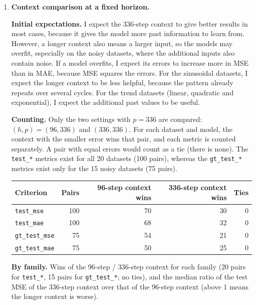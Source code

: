 \documentclass[12pt]{article}
\theoremstyle{definition}
\begin{document}
{\begin{enumerate}[label=\textbf{1.2.\arabic*}, leftmargin=*]
\item \textbf{Context comparison at a fixed horizon.}\par
\textbf{Initial expectations.} I expect the 336-step context to give better results in most cases, because it gives the model more past information to learn from. However, a longer context also means a larger input, so the models may overfit, especially on the noisy datasets, where the additional inputs also contain noise. If a model overfits, I expect its errors to increase more in MSE than in MAE, because MSE squares the errors. For the sinusoidal datasets, I expect the longer context to be less helpful, because the pattern already repeats over several cycles. For the trend datasets (linear, quadratic and exponential), I expect the additional past values to be useful.

\textbf{Counting.} Only the two settings with $p=336$ are compared: $(h,p)=(96,336)$ and $(336,336)$. For each dataset and model, the context with the smaller error wins that pair, and each metric is counted separately. A pair with equal errors would count as a tie (there is none). The \texttt{test\_*} metrics exist for all 20 datasets (100 pairs), whereas the \texttt{gt\_test\_*} metrics exist only for the 15 noisy datasets (75 pairs).

\begin{center}
\small
\begin{tabular}{@{}lrrrr@{}}
\toprule
Criterion & Pairs & 96-step context wins & 336-step context wins & Ties \\
\midrule
\texttt{test\_mse} & 100 & 70 & 30 & 0 \\
\texttt{test\_mae} & 100 & 68 & 32 & 0 \\
\texttt{gt\_test\_mse} & 75 & 54 & 21 & 0 \\
\texttt{gt\_test\_mae} & 75 & 50 & 25 & 0 \\
\bottomrule
\end{tabular}
\end{center}

\textbf{By family.} Wins of the 96-step / 336-step context for each family (20 pairs for \texttt{test\_*}, 15 pairs for \texttt{gt\_test\_*}; no ties), and the median ratio of the test MSE of the 336-step context over that of the 96-step context (above 1 means the longer context is worse).


\end{enumerate}}
\end{document}
